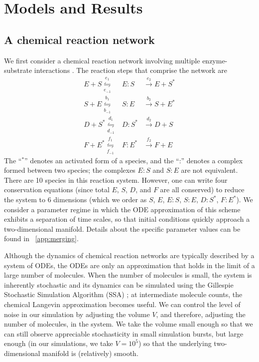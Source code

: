 \section{Models and Results} \label{sec:examples}

\subsection{A chemical reaction network}\label{subsec:rxn_network}

We first consider a chemical reaction network involving  multiple enzyme-substrate interactions \cite{zagaris2012stability}.
%
The reaction steps that comprise the network are\\
\begin{equation}
\begin{array}{rcl}
E + S \overset{e_1}{\underset{e_{-1}}{\leftrightharpoons}} & E:S & \overset{e_2}{\rightarrow} E + S^{*} \\
S + E \overset{b_1}{\underset{b_{-1}}{\leftrightharpoons}} & S:E & \overset{b_2}{\rightarrow} S + E^{*}\\
D + S^{*} \overset{d_1}{\underset{d_{-1}}{\leftrightharpoons}} & D:S^{*} & \overset{d_2}{\rightarrow} D + S\\
F + E^{*} \overset{f_1}{\underset{f_{-1}}{\leftrightharpoons}} & F:E^{*} & \overset{f_2}{\rightarrow} F + E
\end{array}
\end{equation}
The ``$^{*}$'' denotes an activated form of a species, and the ``:'' denotes a complex formed between two species; the complexes $E:S$ and $S:E$ are not equivalent.
%
There are 10 species in this reaction system.
%
However, one can write four conservation equations (since total $E$, $S$, $D$, and $F$ are all conserved) to reduce the system to 6 dimensions
(which we order as $S$, $E$, $E:S$, $S:E$, $D:S^{*}$, $F:E^{*}$).
%
We consider a parameter regime in which the ODE approximation of this scheme exhibits a separation of time scales, so that initial conditions quickly approach a two-dimensional manifold.
%
Details about the specific parameter values can be found in \app~\ref{app:merging}.

Although the dynamics of chemical reaction networks are typically described by a system of ODEs, the ODEs are only an approximation that holds
in the limit of a large number of molecules.
%
When the number of molecules is small, the system is inherently stochastic and its dynamics can be simulated using the
Gillespie Stochastic Simulation Algorithm (SSA) \cite{gillespie1977exact}; at intermediate molecule counts, the chemical Langevin approximation \cite{gillespie2000chemical}
becomes useful.
%
We can control the level of noise in our simulation by adjusting the volume $V$, and therefore, adjusting the number of molecules, in the system.
%
We take the volume small enough so that we can still observe appreciable stochasticity in small simulation bursts, but large enough (in our simulations, we take $V=10^5$) so that the underlying two-dimensional manifold is (relatively) smooth.


